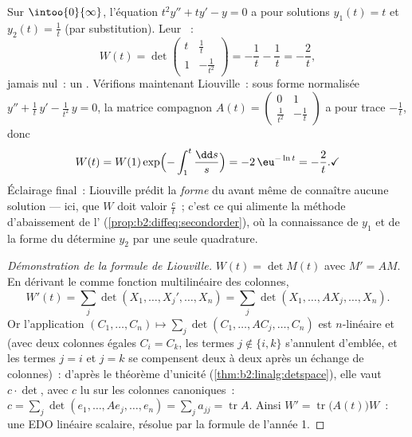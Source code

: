\begin{example}\label{ex:b2:diffeq:eulerwronskian}
Sur $\intoo{0}{\infty}$, l'équation $t^2y'' + ty' - y = 0$ a pour
solutions $y_1(t) = t$ et $y_2(t) = \frac1t$ (par substitution).
Leur ~:
\[
W(t) = \det\begin{pmatrix} t & \tfrac1t\\[2pt]
1 & -\tfrac{1}{t^2}\end{pmatrix}
= -\frac1t - \frac1t = -\frac2t ,
\]
jamais nul~: un . Vérifions maintenant
Liouville~: sous forme normalisée $y'' + \frac1t\,y' -
\frac{1}{t^2}\,y = 0$, la matrice compagnon $A(t) =
\begin{pmatrix} 0 & 1\\ \frac{1}{t^2}
& -\frac1t\end{pmatrix}$ a pour trace $-\frac1t$, donc
\[
W(t) = W(1)\exp\Bigl(-\int_1^t\frac{\dd s}{s}\Bigr)
= -2\,\eu^{-\ln t} = -\frac2t . \checkmark
\]
Éclairage final~: Liouville prédit la \emph{forme} du 
avant même de connaître aucune solution --- ici, que $W$ doit
valoir $\frac{c}{t}$~; c'est ce qui alimente la méthode
d'abaissement de l'
(\cref{prop:b2:diffeq:secondorder}), où la connaissance de $y_1$
et de la forme du  détermine $y_2$ par une seule
quadrature.
\end{example}

\begin{proof}[Démonstration de la formule de Liouville]
$W(t) = \det M(t)$ avec $M' = AM$. En dérivant le 
comme fonction multilinéaire des colonnes,
\[
W'(t) = \sum_j \det(X_1, \dots, X_j', \dots, X_n)
= \sum_j \det(X_1, \dots, AX_j, \dots, X_n) .
\]
Or l'application $(C_1, \dots, C_n) \mapsto \sum_j \det(C_1, \dots,
AC_j, \dots, C_n)$ est $n$-linéaire et  (avec deux colonnes
égales $C_i = C_k$, les termes $j \notin \{i, k\}$ s'annulent
d'emblée, et les termes $j = i$ et $j = k$ se compensent deux à deux
après un échange de colonnes)~: d'après le théorème d'unicité
(\cref{thm:b2:linalg:detspace}), elle vaut $c \cdot \det$, avec $c$
lu sur les colonnes canoniques~: $c = \sum_j \det(e_1, \dots, Ae_j,
\dots, e_n) = \sum_j a_{jj} = \operatorname{tr} A$. Ainsi $W' =
\operatorname{tr}\bigl(A(t)\bigr)W$~: une EDO linéaire scalaire,
résolue par la formule de l'année 1.
\end{proof}

